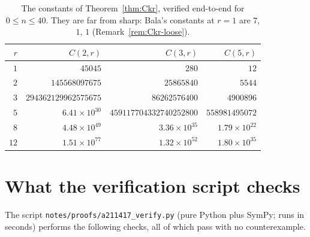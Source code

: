 \documentclass[11pt]{article}
\theoremstyle{plain}
\theoremstyle{definition}
\theoremstyle{remark}
\numberwithin{equation}{section}
\begin{document}
\begin{table}[ht]
\centering
\small
\begin{tabular}{@{}rrrr@{}}
\toprule
$r$ & $C(2,r)$ & $C(3,r)$ & $C(5,r)$ \\
\midrule
$1$ & $45045$ & $280$ & $12$ \\
$2$ & $145568097675$ & $25865840$ & $5544$ \\
$3$ & $294362129962575675$ & $86262576400$ & $4900896$ \\
$5$ & $6.41\times10^{30}$ & $459117704332740252800$ & $558981495072$ \\
$8$ & $4.48\times10^{49}$ & $3.36\times10^{35}$ & $1.79\times10^{22}$ \\
$12$ & $1.51\times10^{77}$ & $1.32\times10^{52}$ & $1.80\times10^{35}$ \\
\bottomrule
\end{tabular}
\caption{The constants of Theorem~\ref{thm:Ckr}, verified end-to-end for $0 \le n \le 40$. They
are far from sharp: Bala's constants at $r=1$ are $7$, $1$, $1$
(Remark~\ref{rem:Ckr-loose}).}
\label{tab:Ckr}
\end{table}

\section{What the verification script checks}
\label{app:script}

The script \texttt{notes/proofs/a211417\_verify.py} (pure Python plus SymPy; runs in seconds)
performs the following checks, all of which pass with no counterexample.
\end{document}
